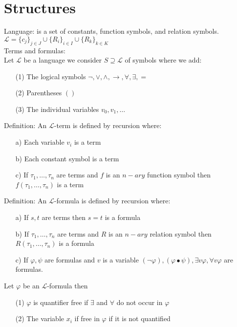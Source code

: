 \documentclass[10pt]{article}
\begin{document}
\section*{Structures}
Language: is a set of constants, function symbols, and relation symbols. $\mathcal{L}=\{c_j\}_{j\in J}\cup\{R_i\}_{i\in I}\cup\{R_k\}_{k\in K}$\\
Terms and formulas:\\
Let $\mathcal{L}$ be a language we consider $S\supseteq \mathcal{L}$ of symbols where we add: 
\begin{itemize}
    \item [(1)] The logical symbols $\lnot,\lor,\land,\rightarrow,\forall,\exists,=$
    \item [(2)] Parentheses $()$
    \item [(3)] The individual variables $v_0,v_1,\ldots$
\end{itemize}
Definition: An $\mathcal{L}$-term is defined by recursion where:
\begin{itemize}
    \item [a)] Each variable $v_i$ is a term
    \item [b)] Each constant symbol is a term
    \item [c)] If $\tau_1,\ldots,\tau_n$ are terms and $f$ is an $n-ary$ function symbol then $f(\tau_1,\ldots,\tau_n)$ is a term
\end{itemize}
Definition: An $\mathcal{L}$-formula is defined by recursion where:
\begin{itemize}
    \item [a)] If $s,t$ are terms then $s=t$ is a formula
    \item [b)] If $\tau_1,\ldots,\tau_n$ are terms and $R$ is an $n-ary$ relation symbol then $R(\tau_1,\ldots,\tau_n)$ is a formula
    \item [c)] If $\varphi,\psi$ are formulas and $v$ is a variable $(\lnot\varphi),(\varphi\bullet\psi),\exists v\varphi,\forall v\varphi$ are formulas.
\end{itemize}
Let $\varphi$ be an $\mathcal{L}$-formula then
\begin{itemize}
    \item [(1)] $\varphi$ is quantifier free if $\exists$ and $\forall$ do not occur in $\varphi$
    \item [(2)] The variable $x_i$ if free in $\varphi$ if it is not quantified
\end{itemize}
\end{document}
